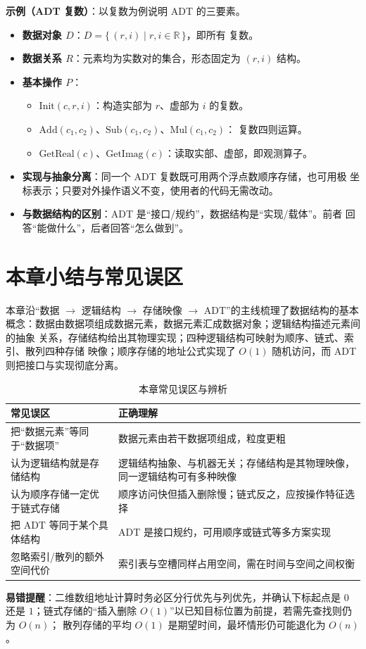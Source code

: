 \textbf{示例（ADT 复数）}：以复数为例说明 ADT 的三要素。
\begin{itemize}
    \item \textbf{数据对象 $D$}：$D = \{\, (r, i) \mid r, i \in \mathbb{R} \,\}$，即所有
          复数。
    \item \textbf{数据关系 $R$}：元素均为实数对的集合，形态固定为 $(r, i)$ 结构。
    \item \textbf{基本操作 $P$}：
    \begin{itemize}
        \item $\text{Init}(c, r, i)$：构造实部为 $r$、虚部为 $i$ 的复数。
        \item $\text{Add}(c_1, c_2)$、$\text{Sub}(c_1, c_2)$、$\text{Mul}(c_1, c_2)$：
              复数四则运算。
        \item $\text{GetReal}(c)$、$\text{GetImag}(c)$：读取实部、虚部，即观测算子。
    \end{itemize}
\end{itemize}

\begin{itemize}
    \item \textbf{实现与抽象分离}：同一个 ADT 复数既可用两个浮点数顺序存储，也可用极
          坐标表示；只要对外操作语义不变，使用者的代码无需改动。
    \item \textbf{与数据结构的区别}：ADT 是“接口/规约”，数据结构是“实现/载体”。前者
          回答“能做什么”，后者回答“怎么做到”。
\end{itemize}

\section{本章小结与常见误区}

本章沿“数据 $\to$ 逻辑结构 $\to$ 存储映像 $\to$ ADT”的主线梳理了数据结构的基本
概念：数据由数据项组成数据元素，数据元素汇成数据对象；逻辑结构描述元素间的抽象
关系，存储结构给出其物理实现；四种逻辑结构可映射为顺序、链式、索引、散列四种存储
映像；顺序存储的地址公式实现了 $O(1)$ 随机访问，而 ADT 则把接口与实现彻底分离。

\begin{table}[htbp]
\centering
\renewcommand{\arraystretch}{1.4}
\begin{tabulary}{\textwidth}{@{}LL@{}}
\toprule
\textbf{常见误区} & \textbf{正确理解} \\
\midrule
把“数据元素”等同于“数据项” & 数据元素由若干数据项组成，粒度更粗 \\
认为逻辑结构就是存储结构 & 逻辑结构抽象、与机器无关；存储结构是其物理映像，同一逻辑结构可有多种映像 \\
认为顺序存储一定优于链式存储 & 顺序访问快但插入删除慢；链式反之，应按操作特征选择 \\
把 ADT 等同于某个具体结构 & ADT 是接口规约，可用顺序或链式等多方案实现 \\
忽略索引/散列的额外空间代价 & 索引表与空槽同样占用空间，需在时间与空间之间权衡 \\
\bottomrule
\end{tabulary}
\caption{本章常见误区与辨析}
\label{tab:pitfalls}
\end{table}

\textbf{易错提醒}：二维数组地址计算时务必区分行优先与列优先，并确认下标起点是 $0$ 还是
$1$；链式存储的“插入删除 $O(1)$”以已知目标位置为前提，若需先查找则仍为 $O(n)$；
散列存储的平均 $O(1)$ 是期望时间，最坏情形仍可能退化为 $O(n)$。
